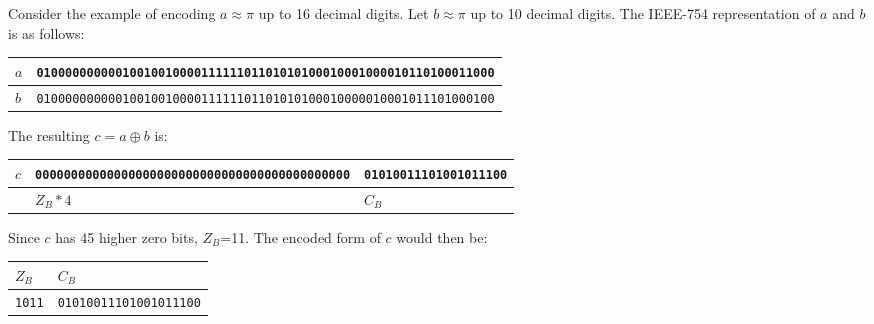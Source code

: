 \documentclass[lettersize,journal]{IEEEtran}
\begin{document}
Consider the example of encoding \(a \approx \pi\) up to 16 decimal digits. Let \(b\approx \pi\) 
up to 10 decimal digits. The IEEE-754 representation of \(a\) and \(b\) is as follows:

\begin{table}[!h]
	\centering
	\fontsize{5.5}{1.2} {
	\begin{tabularx}{\columnwidth}{ 
			| >{\raggedleft\arraybackslash}l 
			| >{\raggedright\arraybackslash}X |}
		\hline
		 \(a\) & \texttt{0100000000001001001000011111101101010100010001000010110100011000} \\
		\hline
		\(b\) & \texttt{0100000000001001001000011111101101010100010000010001011101000100} \\
		\hline
	\end{tabularx}
}
\end{table}

The resulting \(c=a \oplus b\) is:

\begin{table}[!h]
	\centering
	\fontsize{5.5}{1.2} {
		\begin{tabularx}{\columnwidth}{ 
				| >{\raggedleft\arraybackslash}l 
				| >{\raggedright\arraybackslash}l 
 			    | >{\raggedright\arraybackslash}X |}
			\hline
			\(c\) & \texttt{00000000000000000000000000000000000000000000} & \texttt{01010011101001011100} \\
			\hline
		    & \multicolumn{1}{c|} {\(Z_B * 4\)} & \multicolumn{1}{c|} {\(C_B\)} \\ 
			\hline
		\end{tabularx}
	}
\end{table}

Since \(c\) has 45 higher zero bits, \(Z_B\)=11. The encoded form of \(c\) would then be:

\begin{table}[!h]
	\centering
	\fontsize{5.5}{1.2} {
		\begin{tabularx}{0.4\columnwidth}{ 
				| >{\raggedright\arraybackslash}l 
				| >{\raggedright\arraybackslash}X |}
			\hline
			\multicolumn{1}{|c|} {\(Z_B\)} & \multicolumn{1}{c|} {\(C_B\)} \\ 
			\hline
			\texttt{1011} & \texttt{01010011101001011100} \\
			\hline
		\end{tabularx}
	}
\end{table}
\end{document}
